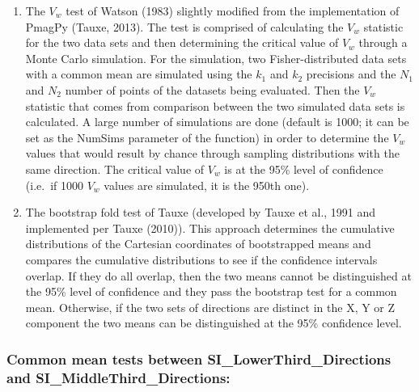 \documentclass[letterpaper,10pt,english]{/Users/polarwander/Library/Enthought/Canopy_64bit/User/lib/python2.7/site-packages/sphinx/texinputs/sphinxhowto}
\begin{document}
\begin{enumerate}
\def\labelenumi{\arabic{enumi}.}
\itemsep1pt\parskip0pt
\item
  The $V_w$ test of Watson (1983) slightly modified from the
  implementation of PmagPy (Tauxe, 2013). The test is comprised of
  calculating the $V_w$ statistic for the two data sets and then
  determining the critical value of $V_w$ through a Monte Carlo
  simulation. For the simulation, two Fisher-distributed data sets with
  a common mean are simulated using the $k_1$ and $k_2$ precisions and
  the $N_1$ and $N_2$ number of points of the datasets being evaluated.
  Then the $V_w$ statistic that comes from comparison between the two
  simulated data sets is calculated. A large number of simulations are
  done (default is 1000; it can be set as the NumSims parameter of the
  function) in order to determine the $V_w$ values that would result by
  chance through sampling distributions with the same direction. The
  critical value of $V_w$ is at the 95\% level of confidence (i.e.~if
  1000 $V_w$ values are simulated, it is the 950th one).
\item
  The bootstrap fold test of Tauxe (developed by Tauxe et al., 1991 and
  implemented per Tauxe (2010)). This approach determines the cumulative
  distributions of the Cartesian coordinates of bootstrapped means and
  compares the cumulative distributions to see if the confidence
  intervals overlap. If they do all overlap, then the two means cannot
  be distinguished at the 95\% level of confidence and they pass the
  bootstrap test for a common mean. Otherwise, if the two sets of
  directions are distinct in the X, Y or Z component the two means can
  be distinguished at the 95\% confidence level.
\end{enumerate}\subsubsection{Common mean tests between SI\_LowerThird\_Directions and
SI\_MiddleThird\_Directions:}

\end{document}
